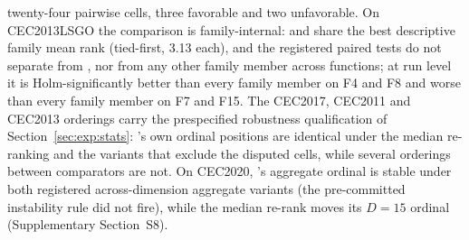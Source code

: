 twenty-four pairwise cells, three favorable and two
unfavorable. %
On CEC2013LSGO the comparison is family-internal: \dtgsk{} and \agsk{}
share the best descriptive family mean rank (tied-first, 3.13 each),
and the registered paired tests do not separate \dtgsk{} from \agsk{}
, nor from any other family member across functions; at run level it
is Holm-significantly better than every family member on F4 and F8 and
worse than every family member on F7 and
F15. %
The CEC2017, CEC2011 and CEC2013 orderings carry the prespecified
robustness qualification of Section~\ref{sec:exp:stats}: \dtgsk{}'s own ordinal
positions are identical under the median re-ranking and the
variants that exclude the disputed cells, while several orderings between
comparators are not. On CEC2020, \dtgsk{}'s aggregate ordinal is stable
under both registered across-dimension aggregate variants (the
pre-committed instability rule did not fire), while the median re-rank
moves its $D = 15$ ordinal
(Supplementary Section~S8). %

